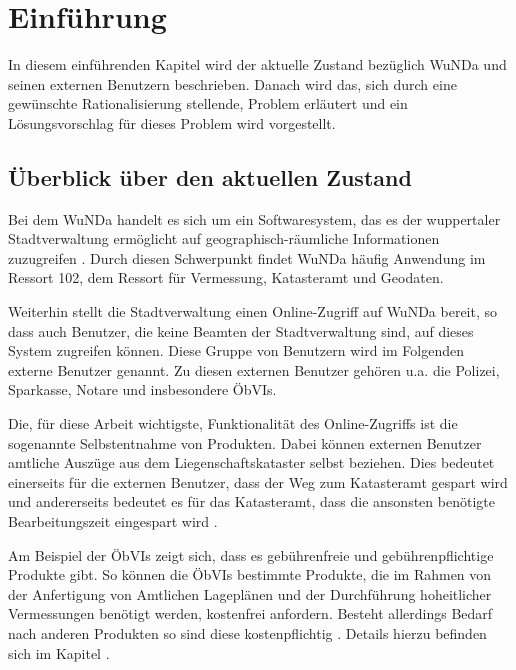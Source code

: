 \chapter{Einführung}
In diesem einführenden Kapitel wird der aktuelle Zustand bezüglich \acs{WuNDa} und seinen externen Benutzern beschrieben. Danach wird das, sich durch eine gewünschte Rationalisierung stellende, Problem erläutert und ein Lösungsvorschlag für dieses Problem wird vorgestellt.
\section{Überblick über den aktuellen Zustand}
Bei dem \ac{WuNDa} handelt es sich um ein Softwaresystem, das es der wuppertaler Stadtverwaltung ermöglicht auf geographisch-räumliche Informationen zuzugreifen \autocite[vgl.][]{cismet-wunda}. Durch diesen Schwerpunkt findet \ac{WuNDa} häufig Anwendung im Ressort 102, dem Ressort für Vermessung, Katasteramt und Geodaten.

Weiterhin stellt die Stadtverwaltung einen Online-Zugriff auf \ac{WuNDa} bereit, so dass auch Benutzer, die keine Beamten der Stadtverwaltung sind, auf dieses System zugreifen können. Diese Gruppe von Benutzern wird im Folgenden externe Benutzer genannt.
Zu diesen externen Benutzer gehören u.a. die Polizei, Sparkasse, Notare und insbesondere \acp{ÖbVI}.

Die, für diese Arbeit wichtigste, Funktionalität des Online-Zugriffs ist die sogenannte Selbstentnahme von Produkten. Dabei können externen Benutzer amtliche Auszüge aus dem Liegenschaftskataster selbst beziehen. Dies bedeutet einerseits für die externen Benutzer, dass der Weg zum Katasteramt gespart wird und andererseits bedeutet es für das Katasteramt, dass die ansonsten benötigte Bearbeitungszeit eingespart wird \autocite[vgl.][]{wupp-wunda}.

Am Beispiel der \acp{ÖbVI} zeigt sich, dass es gebührenfreie und gebührenpflichtige Produkte gibt.
So können die \acp{ÖbVI} bestimmte Produkte, die im Rahmen von der Anfertigung von Amtlichen Lageplänen und der Durchführung hoheitlicher Vermessungen benötigt werden, kostenfrei anfordern.
Besteht allerdings Bedarf nach anderen Produkten so sind diese kostenpflichtig \autocite[vgl.][]{wupp-wunda-oebvi}. Details hierzu befinden sich im Kapitel .


